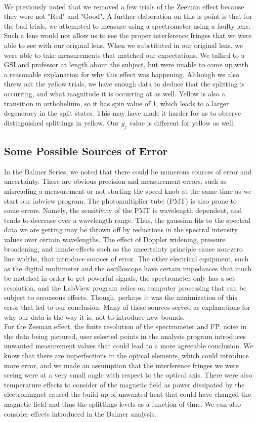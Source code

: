 \documentclass{article}
\begin{document}
    \\\indent We previously noted that we removed a few trials of the Zeeman effect because they were not "Red" and "Good". A further elaboration on this is point is that for the bad trials, we attempted to measure using a spectrometer using a faulty lens. Such a lens would not allow us to see the proper interference fringes that we were able to see with our original lens. When we substituted in our original lens, we were able to take measurements that matched our expectations. We talked to a GSI and professor at length about the subject, but were unable to come up with a reasonable explanation for why this effect was happening. Although we also threw out the yellow trials, we have enough data to deduce that the splitting is occurring, and what magnitude it is occurring at as well. Yellow is also a transition in orthohelium, so it has spin value of 1, which leads to a larger degeneracy in the split states. This may have made it harder for us to observe distinguished splittings in yellow. Our $g_j$ value is different for yellow as well.
    \subsection{Some Possible Sources of Error}
    In the Balmer Series, we noted that there could be numerous sources of error and uncertainty. There are obvious precision and measurement errors, such as misreading a measurement or not starting the speed knob at the same time as we start our labview program. The photomultiplier tube (PMT) is also prone to some errors. Namely, the sensitivity of the PMT is wavelength dependent, and tends to decrease over a wavelength range. Thus, the gaussian fits to the spectral data we are getting may be thrown off by reductions in the spectral intensity values over certain wavelengths. The effect of Doppler widening, pressure broadening, and innate effects such as the uncertainty principle cause non-zero line widths, that introduce sources of error. The other electrical equipment, such as the digital multimeter and the oscilloscope have certain impedances that much be matched in order to get powerful signals, the spectrometer only has a set resolution, and the LabView program relies on computer processing that can be subject to erroneous effects. Though, perhaps it was the minimization of this error that led to our conclusion. Many of these sources served as explanations for why our data is the way it is, not to introduce new bounds.
    \\\indent For the Zeeman effect, the finite resolution of the spectrometer and FP, noise in the data being pictured, user selected points in the analysis program introduces unwanted measurement values that could lead to a more agreeable conclusion. We know that there are imperfections in the optical elements, which could introduce more error, and we made an assumption that the interference fringes we were seeing were at a very small angle with respect to the optical axis. There were also temperature effects to consider of the magnetic field as power dissipated by the electromagnet caused the build up of unwanted heat that could have changed the magnetic field and thus the splittings levels as a function of time. We can also consider effects introduced in the Balmer analysis.
\end{document}
